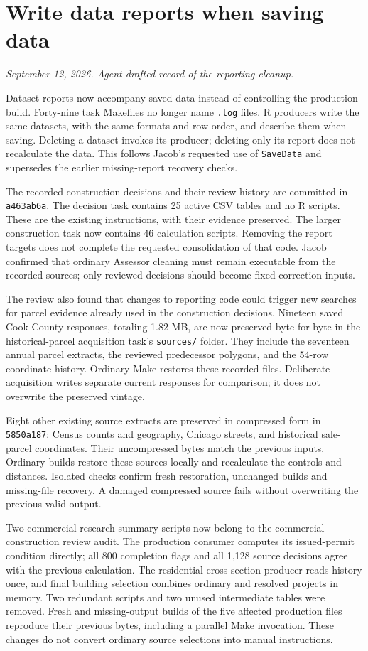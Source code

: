 \section*{Write data reports when saving data}
\textit{September 12, 2026. Agent-drafted record of the reporting cleanup.}

Dataset reports now accompany saved data instead of controlling the production
build. Forty-nine task Makefiles no longer name \texttt{.log} files. R producers
write the same datasets, with the same formats and row order, and describe them
when saving. Deleting a dataset invokes its producer; deleting only its report
does not recalculate the data. This follows Jacob's requested use of
\texttt{SaveData} and supersedes the earlier missing-report recovery checks.

The recorded construction decisions and their review history are committed in
\texttt{a463ab6a}. The decision task contains 25 active CSV tables and no R
scripts. These are the existing instructions, with their evidence preserved.
The larger construction task now contains 46 calculation scripts. Removing
the report targets does not complete the requested consolidation of that code.
Jacob confirmed that ordinary Assessor cleaning must remain executable from the
recorded sources; only reviewed decisions should become fixed correction inputs.

The review also found that changes to reporting code could trigger new searches
for parcel evidence already used in the construction decisions. Nineteen saved
Cook County responses, totaling 1.82 MB, are now preserved byte for byte in the
historical-parcel acquisition task's \texttt{sources/} folder. They include the
seventeen annual parcel extracts, the reviewed predecessor polygons, and the
54-row coordinate history. Ordinary Make restores these recorded files.
Deliberate acquisition writes separate current responses for comparison; it
does not overwrite the preserved vintage.

Eight other existing source extracts are preserved in compressed form in
\texttt{5850a187}: Census counts and geography, Chicago streets, and historical
sale-parcel coordinates. Their uncompressed bytes match the previous inputs.
Ordinary builds restore these sources locally and recalculate the controls and
distances. Isolated checks confirm fresh restoration, unchanged builds and
missing-file recovery. A damaged compressed source fails without overwriting
the previous valid output.

Two commercial research-summary scripts now belong to the commercial construction
review audit. The production consumer computes its issued-permit condition
directly; all 800 completion flags and all 1,128 source decisions agree with the
previous calculation. The residential cross-section producer reads history once,
and final building selection combines ordinary and resolved projects in memory.
Two redundant scripts and two unused intermediate tables were removed. Fresh
and missing-output builds of the five affected production files reproduce their
previous bytes, including a parallel Make invocation. These changes do not
convert ordinary source selections into manual instructions.

